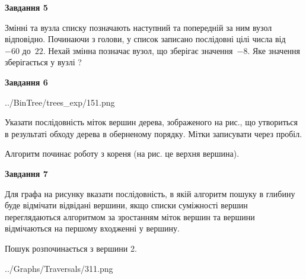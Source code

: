 \documentclass[12pt, ukrainian]{article}
\begin{document}
{\begin {large}
{\begin {center}\textbf{Завдання 5}\end {center}}\par
Змінні  та  вузла списку позначають наступний та попередній за ним вузол відповідно. Починаючи з голови, у список записано послідовні цілі числа від~$-60$ до~$22$. Нехай змінна  позначає вузол, що зберігає значення~$-8$.
Яке значення зберігається у вузлі  ?\par
\newpage

{\begin {center}\textbf{Завдання 6}\end {center}}\par

\begin{center}
	{../BinTree/trees_exp/151.png}
\end{center}
Указати послідовність міток вершин дерева, зображеного на рис., що утвориться в результаті обходу дерева в оберненому порядку. Мітки записувати через пробіл.\par Алгоритм починає роботу з кореня (на рис. це верхня вершина).\par
\newpage

{\begin {center}\textbf{Завдання 7}\end {center}}\par
Для графа на рисунку вказати послідовність, в якій алгоритм пошуку в глибину буде відмічати відвідані вершини, якщо списки суміжності вершин переглядаються алгоритмом за зростанням міток вершин та вершини відмічаються на першому вход\-женні у вершину.\par
Пошук розпочинається з вершини 2.\par

\begin{center}
	{../Graphs/Traversals/311.png}
\end{center}\par
\newpage


\end{large}}
\end{document}
